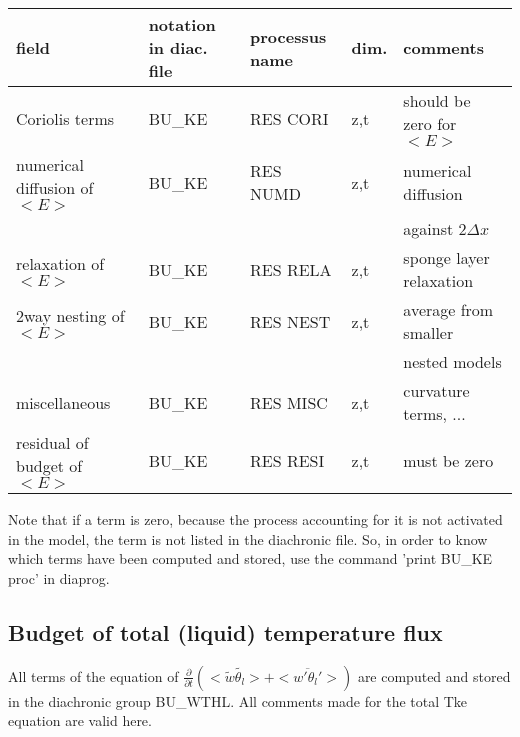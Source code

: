 \begin{center}
\begin{tabular}{||p{5cm}|>{\centering}p{2cm}|>{\centering}p{2.5cm}|>{\centering}p{0.5cm}|p{5.5cm }||}
\hline
\hline
field & notation in diac. file& processus name& dim.  & comments \\
\hline
\hline
{\rm Coriolis terms} & BU\_KE & RES CORI & z,t & should be zero for $<E>$ \\
\hline
{\rm numerical diffusion of } $<E>$& BU\_KE & RES NUMD & z,t & numerical diffusion\\
 & & & &against $2\Delta x$ \\
\hline
{\rm relaxation of }$<E>$ & BU\_KE & RES RELA & z,t& sponge layer relaxation \\
\hline
{\rm 2way nesting of }$<E>$ & BU\_KE & RES NEST & z,t& average from smaller\\
 & & & &nested models \\
\hline
{\rm miscellaneous} & BU\_KE & RES MISC & z,t & curvature terms, ... \\
\hline
{\rm residual of budget of} $<E>$ & BU\_KE & RES RESI & z,t & must be zero \\
\hline
\hline
\end{tabular}
\end{center}


Note that if a term is zero, because the process accounting for it is
not activated in the model, the term is not listed in the diachronic file.
So, in order to know which terms have been computed and stored, use
the command 'print BU\_KE proc' in diaprog.\\ 

\subsection{Budget of total (liquid) temperature flux}

All terms of the equation of $\frac{\partial}{\partial t} (<\tilde{w}\tilde{\theta_l}> + <\overline{w'\theta_l'}>)$ are
computed and stored in the diachronic group BU\_WTHL. 
All comments made for the total Tke equation are valid here.\\

